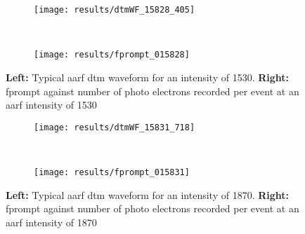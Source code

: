 \begin{figure}
    \centering
    \begin{subfigure}[t]{0.48\textwidth}
		\texttt{[image: results/dtmWF\_15828\_405]}
		\label{Fig:wfMedium}
    \end{subfigure}
    ~ %
    \begin{subfigure}[t]{0.48\textwidth}
        \texttt{[image: results/fprompt\_015828]}
        \label{Fig:fprompt15828}
    \end{subfigure}
    \caption{\textbf{Left:} Typical \gls{aarf} \gls{dtm} waveform for an intensity of 1530. \textbf{Right:} \gls{fprompt} against number of photo electrons recorded per event at an \gls{aarf} intensity of 1530}
    \label{Fig:wf_Fprompt_mid}
\end{figure}

\begin{figure}
    \centering
    \begin{subfigure}[t]{0.48\textwidth}
		\texttt{[image: results/dtmWF\_15831\_718]}
		\label{Fig:wfHigh}
    \end{subfigure}
    ~ %
    \begin{subfigure}[t]{0.48\textwidth}
        \texttt{[image: results/fprompt\_015831]}
        \label{Fig:fprompt15831}
    \end{subfigure}
    \caption{\textbf{Left:} Typical \gls{aarf} \gls{dtm} waveform for an intensity of 1870. \textbf{Right:} \gls{fprompt} against number of photo electrons recorded per event at an \gls{aarf} intensity of 1870}
    \label{Fig:wf_Fprompt_high}
\end{figure}
\clearpage

%
%
%
%

